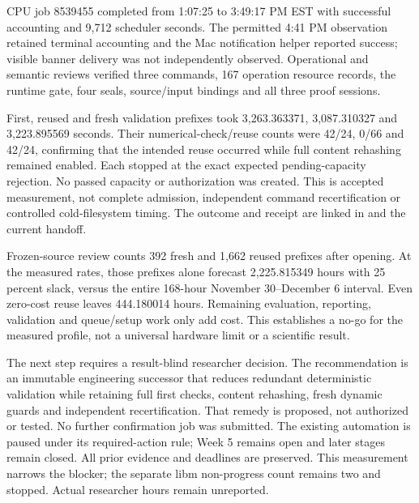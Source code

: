 
CPU job 8539455 completed from 1:07:25 to 3:49:17 PM EST with successful
accounting and 9,712 scheduler seconds. The permitted 4:41 PM observation
retained terminal accounting and the Mac notification helper reported success;
visible banner delivery was not independently observed. Operational and semantic
reviews verified three commands, 167 operation resource records, the runtime
gate, four seals, source/input bindings and all three proof sessions.

First, reused and fresh validation prefixes took 3,263.363371, 3,087.310327 and
3,223.895569 seconds. Their numerical-check/reuse counts were 42/24, 0/66 and
42/24, confirming that the intended reuse occurred while full content rehashing
remained enabled. Each stopped at the exact expected pending-capacity rejection.
No passed capacity or authorization was created. This is accepted measurement,
not complete admission, independent command recertification or controlled
cold-filesystem timing. The outcome and receipt are linked in
 and the current handoff.

Frozen-source review counts 392 fresh and 1,662 reused prefixes after opening.
At the measured rates, those prefixes alone forecast 2,225.815349 hours with
25 percent slack, versus the entire 168-hour November 30--December 6 interval.
Even zero-cost reuse leaves 444.180014 hours. Remaining evaluation, reporting,
validation and queue/setup work only add cost. This establishes a no-go for the
measured profile, not a universal hardware limit or a scientific result.

The next step requires a result-blind researcher decision. The recommendation
is an immutable engineering successor that reduces redundant deterministic
validation while retaining full first checks, content rehashing, fresh dynamic
guards and independent recertification. That remedy is proposed, not authorized
or tested. No further confirmation job was submitted. The existing automation
is paused under its required-action rule; Week 5 remains open and later stages
remain closed. All prior evidence and deadlines are preserved. This measurement
narrows the blocker; the separate libm non-progress count remains two and stopped.
Actual researcher hours remain unreported.


